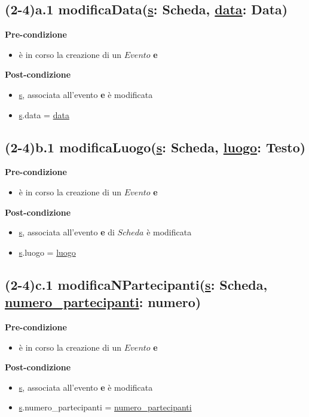 \documentclass[12pt]{extarticle}
\begin{document}
\subsection*{(2-4)a.1 modificaData(\underline{s}: Scheda, \underline{data}: Data)}

\textbf{Pre-condizione}
\begin{itemize}
  \item è in corso la creazione di un $Evento$ \textbf{e}
\end{itemize} 
\textbf{Post-condizione}
\begin{itemize}
  \item \underline{s}, associata all'evento \textbf{e} è modificata
  \item \underline{s}.data = \underline{data} 
\end{itemize} 

\subsection*{(2-4)b.1 modificaLuogo(\underline{s}: Scheda, \underline{luogo}: Testo)}

\textbf{Pre-condizione}
\begin{itemize}
  \item è in corso la creazione di un $Evento$ \textbf{e}
\end{itemize} 
\textbf{Post-condizione}
\begin{itemize}
  \item \underline{s}, associata all'evento \textbf{e} di $Scheda$ è modificata
  \item \underline{s}.luogo = \underline{luogo} 
\end{itemize} 


\subsection*{(2-4)c.1 modificaNPartecipanti(\underline{s}: Scheda, \underline{numero\_partecipanti}: numero)}
\textbf{Pre-condizione}
\begin{itemize}
  \item è in corso la creazione di un $Evento$ \textbf{e}
\end{itemize} 
\textbf{Post-condizione}
\begin{itemize}
  \item \underline{s}, associata all'evento \textbf{e} è modificata
  \item \underline{s}.numero\_partecipanti = \underline{numero\_partecipanti}
\end{itemize}
\end{document}
